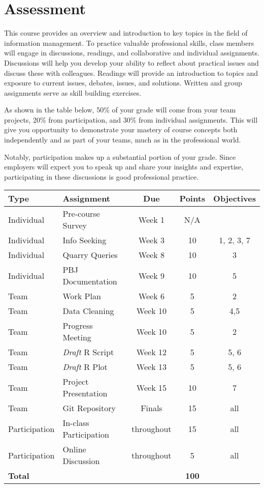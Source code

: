 \documentclass[11pt]{article}
\begin{document}
\section{Assessment}
This course provides an overview and introduction to key topics in the field of information management.
To practice valuable professional skills, class members will engage in discussions, readings, and collaborative and individual assignments.
Discussions will help you develop your ability to reflect about practical issues and discuss these with colleagues. 
Readings will provide an introduction to topics and exposure to current issues, debates, issues, and solutions.
Written and group assignments serve as skill building exercises.

As shown in the table below,  50\% of your grade will come from your team projects,  20\% from participation, and  30\% from individual assignments.
This will give you opportunity to demonstrate your mastery of course concepts both independently and as part of your teams, much as in the professional world.

Notably, participation makes up a substantial portion of your grade.
Since employers will expect you to speak up and share your insights and expertise, participating in these discussions is good professional practice.

\begin{longtable}{ l p{2in} c c c}
	\toprule
	\textbf{Type}&   \textbf{Assignment}&   \textbf{Due} &   \textbf{Points} & \textbf{Objectives}\\
	\midrule
	Individual & Pre-course Survey & Week 1 & N/A & \\
	Individual & Info Seeking & Week 3 & 10 & 1, 2, 3, 7\\
	Individual & Quarry Queries & Week 8 & 10 & 3\\
	Individual & PBJ Documentation & Week 9 & 10 & 5\\
	\midrule
	Team & Work Plan & Week 6 & 5 & 2\\
	Team & Data Cleaning & Week 10 & 5 & 4,5\\
	Team & Progress Meeting & Week 10 & 5 & 2\\
	Team & \textit{Draft} R Script & Week 12 & 5 & 5, 6\\
	Team & \textit{Draft} R Plot & Week 13 & 5 & 5, 6\\
	Team & Project Presentation & Week 15 & 10 & 7\\
	Team & Git Repository & Finals & 15 & all\\
	\midrule
	Participation & In-class Participation & throughout & 15 & all \\
	Participation & Online Discussion & throughout & 5 & all\\
	\midrule
	\textbf{Total}&     &     &   \textbf{100}\\
\end{longtable}
\end{document}
